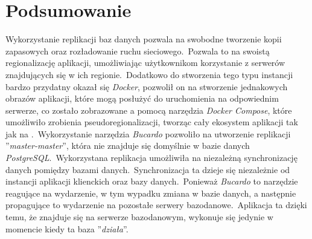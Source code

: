 \section{Podsumowanie}
Wykorzystanie replikacji baz danych pozwala na swobodne tworzenie kopii zapasowych oraz rozładowanie ruchu sieciowego.\ Pozwala to na swoistą regionalizację aplikacji, umożliwiając użytkownikom korzystanie z serwerów znajdujących się w ich regionie.\ Dodatkowo do stworzenia tego typu instancji bardzo przydatny okazał się \textit{Docker}, pozwolił on na stworzenie jednakowych obrazów aplikacji, które mogą posłużyć do uruchomienia na odpowiednim serwerze, co zostało zobrazowane a pomocą narzędzia \textit{Docker Compose}, które umożliwiło zrobienia pseudoregionalizacji, tworząc cały ekosystem aplikacji tak jak na .\ Wykorzystanie narzędzia \textit{Bucardo} pozwoliło na utworzenie replikacji ''\textit{master-master}'', która nie znajduje się domyślnie w bazie danych \textit{PostgreSQL}.\ Wykorzystana replikacja umożliwiła na niezależną synchronizację danych pomiędzy bazami danych.\ Synchronizacja ta dzieje się niezależnie od instancji aplikacji klienckich oraz bazy danych.\ Ponieważ \textit{Bucardo} to narzędzie reagujące na wydarzenie, w tym wypadku zmiana w bazie danych, a następnie propagujące to wydarzenie na pozostałe serwery bazodanowe.\ Aplikacja ta dzięki temu, że znajduje się na serwerze bazodanowym, wykonuje się jedynie w momencie kiedy ta baza ''\textit{działa}''.